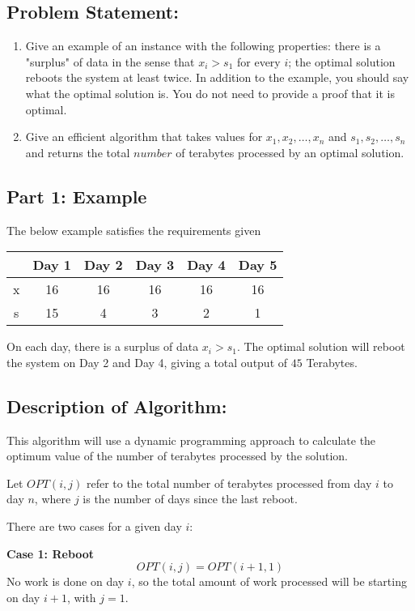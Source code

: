 \documentclass{article}
\begin{document}
\subsection*{Problem Statement:}  
\begin{enumerate}
	\item Give an example of an instance with the following properties: there is a "surplus" of data in the sense that $x_i > s_1$ for every $i$; the optimal solution reboots the system at least twice.
In addition to the example, you should say what the optimal solution is.  You do not need to provide a proof that it is optimal.
	\item Give an efficient algorithm that takes values for $x_1, x_2, \dots , x_n$ and $s_1, s_2, \dots, s_n$ and returns the total $number$ of terabytes processed by an optimal solution.
\end{enumerate}
\subsection*{Part 1:  Example}
The below example satisfies the requirements given
\begin{center}
\begin{tabular}{| c | c | c | c | c | c |} \hline
 & \textbf{Day 1} & \textbf{Day 2} & \textbf{Day 3} & \textbf{Day 4} & \textbf{Day 5} \\ \hline
x & 16 & 16 & 16 & 16 & 16  \\ \hline
s & 15 & 4 & 3 & 2 & 1 \\ \hline
\end{tabular}
\end{center}
On each day, there is a surplus of data $x_i > s_1$.  The optimal solution will reboot the system on Day 2 and Day 4, giving a total output of $45$ Terabytes.

\subsection*{Description of Algorithm:}
This algorithm will use a dynamic programming approach to calculate the optimum value of the number of terabytes processed by the solution.

Let $OPT(i, j)$ refer to the total number of terabytes processed from day $i$ to day $n$, where $j$ is the number of days since the last reboot.

There are two cases for a given day $i$:  

\noindent \textbf{Case 1: Reboot} \newline
$$ OPT(i, j) = OPT(i+1, 1) $$
No work is done on day $i$, so the total amount of work processed will be starting on day $i+1$, with $j=1$.
\end{document}
